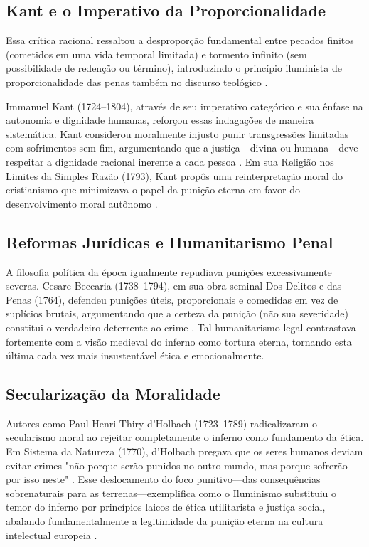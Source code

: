 \subsection{Kant e o Imperativo da Proporcionalidade}

Essa crítica racional ressaltou a desproporção fundamental entre pecados finitos (cometidos em uma vida temporal limitada) e tormento infinito (sem possibilidade de redenção ou término), introduzindo o princípio iluminista de proporcionalidade das penas também no discurso teológico \cite{Beccaria1764}.

Immanuel Kant (1724--1804), através de seu imperativo categórico e sua ênfase na autonomia e dignidade humanas, reforçou essas indagações de maneira sistemática. Kant considerou moralmente injusto punir transgressões limitadas com sofrimentos sem fim, argumentando que a justiça---divina ou humana---deve respeitar a dignidade racional inerente a cada pessoa \cite{Kant1785}. Em sua Religião nos Limites da Simples Razão (1793), Kant propôs uma reinterpretação moral do cristianismo que minimizava o papel da punição eterna em favor do desenvolvimento moral autônomo \cite{Kant1793}.

\subsection{Reformas Jurídicas e Humanitarismo Penal}

A filosofia política da época igualmente repudiava punições excessivamente severas. Cesare Beccaria (1738--1794), em sua obra seminal Dos Delitos e das Penas (1764), defendeu punições úteis, proporcionais e comedidas em vez de suplícios brutais, argumentando que a certeza da punição (não sua severidade) constitui o verdadeiro deterrente ao crime \cite{Maestro1973}. Tal humanitarismo legal contrastava fortemente com a visão medieval do inferno como tortura eterna, tornando esta última cada vez mais insustentável ética e emocionalmente.

\subsection{Secularização da Moralidade}

Autores como Paul-Henri Thiry d'Holbach (1723--1789) radicalizaram o secularismo moral ao rejeitar completamente o inferno como fundamento da ética. Em Sistema da Natureza (1770), d'Holbach pregava que os seres humanos deviam evitar crimes "não porque serão punidos no outro mundo, mas porque sofrerão por isso neste" \cite{d'Holbach1770}. Esse deslocamento do foco punitivo---das consequências sobrenaturais para as terrenas---exemplifica como o Iluminismo substituiu o temor do inferno por princípios laicos de ética utilitarista e justiça social, abalando fundamentalmente a legitimidade da punição eterna na cultura intelectual europeia \cite{Israel2001}.

